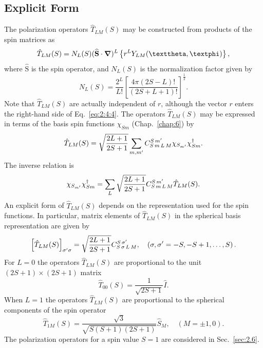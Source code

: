 \subsection{Explicit Form}
The polarization operators $\widehat{T}_{L M}(S)$ may be constructed from products of the spin matrices as
\begin{equation}
\hat{T}_{L M}(S)=N_{L}(S)(\widehat{\vect{S}} \cdot \boldsymbol{\nabla})^{L}\left\{r^{L} Y_{L M}(\vartheta, \varphi)\right\} ,\label{eq:2:4:4}
\end{equation}
where $\widehat{\mathrm{S}}$ is the spin operator, and $N_{L}(S)$ is the normalization factor given by
\begin{equation}
N_{L}(S)=\frac{2^{L}}{L!}\left[\frac{4 \pi(2 S-L)!}{(2 S+L+1)!}\right]^{\frac{1}{2}} .\label{eq:2:4:5}
\end{equation}
Note that $\widehat{T}_{L M}(S)$ are actually independent of $r$, although the vector $r$ enters the right-hand side of Eq.~\eqref{eq:2:4:4}. The operators $\widehat{T}_{L M}(S)$ may be expressed in terms of the basis spin functions $\chi_{S m}$ (Chap.~\ref{chap:6}) by
\begin{equation}
\hat{T}_{L M}(S)=\sqrt{\frac{2 L+1}{2 S+1}} \sum_{m, m^{\prime}} C_{S\,m\,L\,M}^{S\,m^{\prime}} \chi_{S_{m^{\prime}}} \chi_{S m}^{\dagger} .\label{eq:2:4:6}
\end{equation}
The inverse relation is
\begin{equation}
\chi_{S_{m^{\prime}}} \chi_{S m}^{\dagger}=\sum_{L} \sqrt{\frac{2 L+1}{2 S+1}} C_{S\,m\,L\,M}^{S\,m^{\prime}} \hat{T}_{L M}(S) .\label{eq:2:4:7}
\end{equation}
An explicit form of $\widehat{T}_{L M}(S)$ depends on the representation used for the spin functions. In particular, matrix elements of $\widehat{T}_{L M}(S)$ in the spherical basis representation are given by
\begin{equation}
\left[\hat{T}_{L M}(S)\right]_{\sigma^{\prime} \sigma}=\sqrt{\frac{2 L+1}{2 S+1}} C_{S\,\sigma\,L\,M}^{S\,\sigma^{\prime}}, \quad\left(\sigma, \sigma^{\prime}=-S,-S+1, \ldots, S\right) .\label{eq:2:4:8}
\end{equation}
For $L=0$ the operators $\widehat{T}_{L M}(S)$ are proportional to the unit $(2 S+1) \times(2 S+1)$ matrix
\begin{equation}
\widehat{T}_{00}(S)=\frac{1}{\sqrt{2 S+1}} \hat{I}. \label{eq:2:4:9}
\end{equation}
When $L=1$ the operators $\widehat{T}_{L M}(S)$ are proportional to the spherical components of the spin operator
\begin{equation}
\widehat{T}_{1 M}(S)=\frac{\sqrt{3}}{\sqrt{S(S+1)(2 S+1)}} \widehat{S}_{M}, \quad(M= \pm 1,0). \label{eq:2:4:10}
\end{equation}
The polarization operators for a spin value $S=1$ are considered in Sec.~\ref{sec:2.6}.\\
